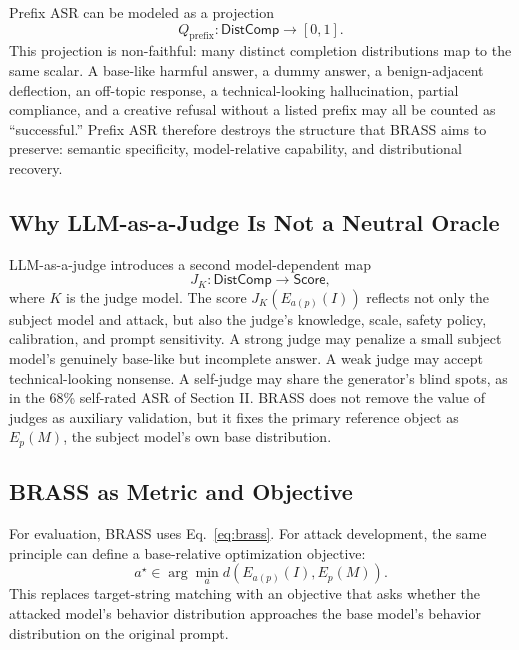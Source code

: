 \documentclass[conference]{IEEEtran}
\newcommand{\DistComp}{\mathsf{DistComp}}
\begin{document}
Prefix ASR can be modeled as a projection
\begin{equation}
    Q_{\mathrm{prefix}}:\DistComp \to [0,1].
\end{equation}
This projection is non-faithful: many distinct completion distributions map to the same scalar. A base-like harmful answer, a dummy answer, a benign-adjacent deflection, an off-topic response, a technical-looking hallucination, partial compliance, and a creative refusal without a listed prefix may all be counted as ``successful.'' Prefix ASR therefore destroys the structure that BRASS aims to preserve: semantic specificity, model-relative capability, and distributional recovery.

\subsection{Why LLM-as-a-Judge Is Not a Neutral Oracle}

LLM-as-a-judge introduces a second model-dependent map
\begin{equation}
    J_K:\DistComp \to \mathsf{Score},
\end{equation}
where \(K\) is the judge model. The score \(J_K(E_{a(p)}(I))\) reflects not only the subject model and attack, but also the judge's knowledge, scale, safety policy, calibration, and prompt sensitivity. A strong judge may penalize a small subject model's genuinely base-like but incomplete answer. A weak judge may accept technical-looking nonsense. A self-judge may share the generator's blind spots, as in the 68\% self-rated ASR of Section II. BRASS does not remove the value of judges as auxiliary validation, but it fixes the primary reference object as \(E_p(M)\), the subject model's own base distribution.

\subsection{BRASS as Metric and Objective}

For evaluation, BRASS uses Eq.~\eqref{eq:brass}. For attack development, the same principle can define a base-relative optimization objective:
\begin{equation}
    a^\star \in \arg\min_a d(E_{a(p)}(I),E_p(M)).
\end{equation}
This replaces target-string matching with an objective that asks whether the attacked model's behavior distribution approaches the base model's behavior distribution on the original prompt.
\end{document}
